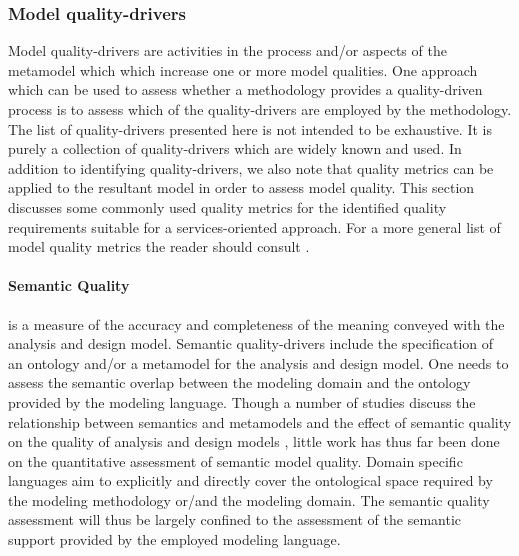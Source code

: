 
\subsubsection{Model quality-drivers}
\label{sec:modelQualityDriversAndMetrics}

Model quality-drivers are activities in the process and/or aspects of the metamodel which which increase one or more model qualities. One approach which can be used to assess whether a methodology provides a quality-driven process is to assess which of the quality-drivers are employed by the methodology. The list of quality-drivers presented here is not intended to be exhaustive. It is purely a collection of quality-drivers which are widely known and used. In addition to identifying quality-drivers, we also note that quality metrics can be applied to the resultant model in order to assess model quality. This section discusses some commonly used quality metrics for the identified quality requirements suitable for a services-oriented approach. For a more general list of model quality metrics the reader should consult \cite{mohagheghi_existing_2009}.

\paragraph{Semantic Quality} is a measure of the accuracy and completeness of the meaning conveyed with the analysis and design model. Semantic quality-drivers include the specification of an ontology and/or a metamodel for the analysis and design model. One needs to assess the semantic overlap between the modeling domain and the ontology provided by the modeling language. Though a number of studies discuss the relationship between semantics and metamodels \cite{staab_model_2010,veldhuis_tool_2009,henderson-sellers_bridging_2011} and the effect of semantic quality on the quality of analysis and design models \cite{buder_effects_2010,staab_model_2010}, little work has thus far been done on the quantitative assessment of semantic model quality. Domain specific languages aim to explicitly and directly cover the ontological space required by the modeling methodology or/and the modeling domain. The semantic quality assessment will thus be largely confined to the assessment of the semantic support provided by the employed modeling language.

